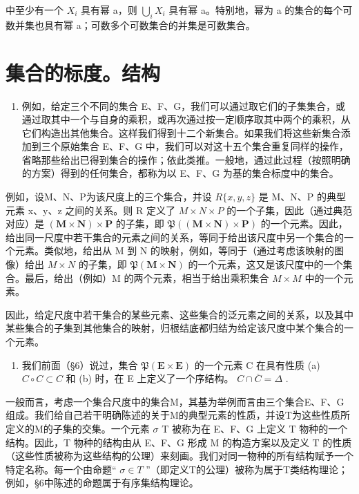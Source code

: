 中至少有一个 \(X_{i}\) 具有幂 a，则 \(\bigcup_{i}X_{i}\) 具有幂 a。特别地，幂为 a 的集合的每个可数并集也具有幂 a；可数多个可数集合的并集是可数集合。

\section{集合的标度。结构}

\begin{enumerate}
\def\labelenumi{\arabic{enumi}.}
\tightlist
\item
  例如，给定三个不同的集合 E、F、G，我们可以通过取它们的子集集合，或通过取其中一个与自身的乘积，或再次通过按一定顺序取其中两个的乘积，从它们构造出其他集合。这样我们得到十二个新集合。如果我们将这些新集合添加到三个原始集合 E、F、G 中，我们可以对这十五个集合重复同样的操作，省略那些给出已得到集合的操作；依此类推。一般地，通过此过程（按照明确的方案）得到的任何集合，都称为以 E、F、G 为基的集合标度中的集合。
\end{enumerate}

例如，设M、N、P为该尺度上的三个集合，并设 \(R\{x, y, z\}\) 是 M、N、P 的典型元素 x、y、z 之间的关系。则 R 定义了 \(M \times N \times P\) 的一个子集，因此（通过典范对应）是 \((\mathbf{M} \times \mathbf{N}) \times \mathbf{P}\) 的子集，即 \(\mathfrak{P}((\mathbf{M} \times \mathbf{N}) \times \mathbf{P})\) 的一个元素。因此，给出同一尺度中若干集合的元素之间的关系，等同于给出该尺度中另一个集合的一个元素。类似地，给出从 M 到 N 的映射，例如，等同于（通过考虑该映射的图像）给出 \(M \times N\) 的子集，即 \(\mathfrak{P}(\mathbf{M} \times \mathbf{N})\) 的一个元素，这又是该尺度中的一个集合。最后，给出（例如）M 的两个元素，相当于给出乘积集合 \(M \times M\) 中的一个元素。

因此，给定尺度中若干集合的某些元素、这些集合的泛元素之间的关系，以及其中某些集合的子集到其他集合的映射，归根结底都归结为给定该尺度中某个集合的一个元素。

\begin{enumerate}
\def\labelenumi{\arabic{enumi}.}
\setcounter{enumi}{1}
\tightlist
\item
  我们前面（§6）说过，集合 \(\mathfrak{P}(\mathbf{E} \times \mathbf{E})\) 的一个元素 C 在具有性质 (a) \(C \circ C \subset C\) 和 (b) 时，在 E 上定义了一个序结构。 \(C \cap \overline{C} = \Delta\) .
\end{enumerate}

一般而言，考虑一个集合尺度中的集合M，其基为举例而言由三个集合E、F、G组成。我们给自己若干明确陈述的关于M的典型元素的性质，并设T为这些性质所定义的M的子集的交集。一个元素 \(\sigma\) T 被称为在 E、F、G 上定义 T 物种的一个结构。因此，T 物种的结构由从 E、F、G 形成 M 的构造方案以及定义 T 的性质（这些性质被称为这些结构的公理）来刻画。我们对同一物种的所有结构赋予一个特定名称。每一个由命题“ \(\sigma \in T\) ''（即定义T的公理）被称为属于T类结构理论；例如，§6中陈述的命题属于有序集结构理论。

